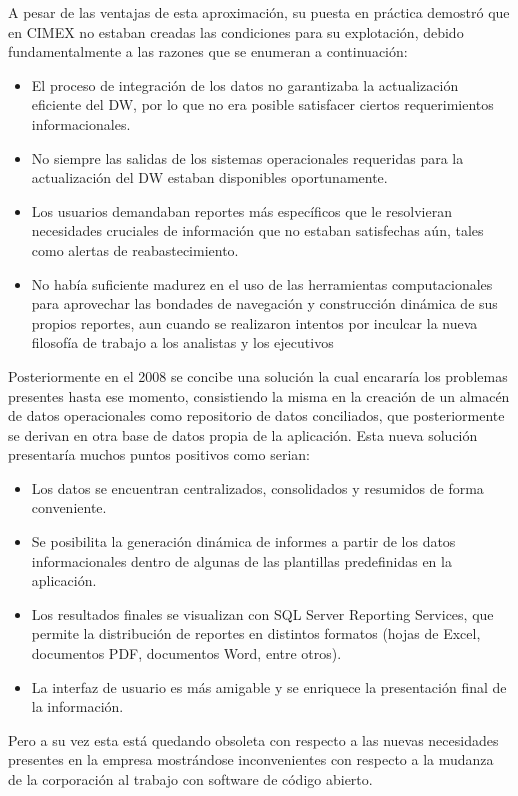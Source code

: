 A pesar de las ventajas de esta aproximación, su puesta en práctica demostró que en CIMEX no estaban creadas las condiciones para su explotación, debido fundamentalmente a las razones que se enumeran a continuación: 

\begin{itemize}
\item El proceso de integración de los datos no garantizaba la actualización eficiente del DW, por lo que no era posible satisfacer ciertos requerimientos informacionales.
\item No siempre las salidas de los sistemas operacionales requeridas para la actualización del DW estaban disponibles oportunamente. 
\item Los usuarios demandaban reportes más específicos que le resolvieran necesidades cruciales de información que no estaban satisfechas aún, tales como alertas de reabastecimiento.
\item No había suficiente madurez en el uso de las herramientas computacionales para aprovechar las bondades de navegación y construcción dinámica de sus propios reportes, aun cuando se realizaron intentos por inculcar la nueva filosofía de trabajo a los analistas y los ejecutivos
\end{itemize}

Posteriormente en el 2008 se concibe una solución la cual encararía los problemas presentes hasta ese momento, consistiendo la misma en la creación de un almacén de datos operacionales como repositorio de datos conciliados, que posteriormente se derivan en otra base de datos propia de la aplicación. Esta nueva solución presentaría muchos puntos positivos como serian:

\begin{itemize}
\item Los datos se encuentran centralizados, consolidados y resumidos de forma conveniente.
\item Se posibilita la generación dinámica de informes a partir de los datos informacionales dentro de algunas de las plantillas predefinidas en la aplicación.
\item Los resultados finales se visualizan con SQL Server Reporting Services, que permite la distribución de reportes en distintos formatos (hojas de Excel, documentos PDF, documentos Word, entre otros).
\item La interfaz de usuario es más amigable y se enriquece la presentación final de la información.
\end{itemize}


Pero a su vez esta está quedando obsoleta con respecto a las nuevas necesidades presentes en la empresa mostrándose inconvenientes con respecto a la mudanza de la corporación al trabajo con software de código abierto.


